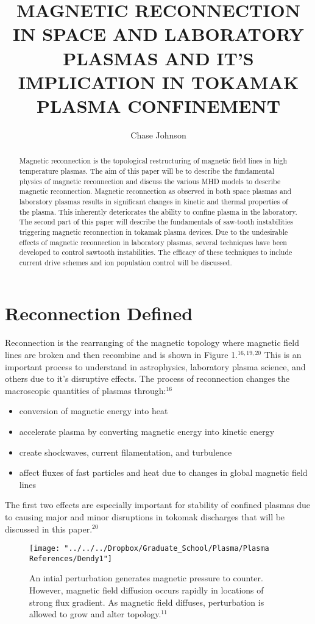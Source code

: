 \documentclass{article}
\begin{document}
\title{MAGNETIC RECONNECTION IN SPACE AND LABORATORY PLASMAS AND IT’S IMPLICATION IN TOKAMAK PLASMA CONFINEMENT}
\author{Chase Johnson}

\maketitle

\begin{abstract}
Magnetic reconnection is the topological restructuring of magnetic field lines in high temperature plasmas.    The aim of this paper will be to describe the fundamental physics of magnetic reconnection and discuss the various MHD models to describe magnetic reconnection.  Magnetic reconnection as observed in both space plasmas and laboratory plasmas results in significant changes in kinetic and thermal properties of the plasma.  This inherently deteriorates the ability to confine plasma in the laboratory.  The second part of this paper will describe the fundamentals of saw-tooth instabilities triggering magnetic reconnection in tokamak plasma devices.  Due to the undesirable effects of magnetic reconnection in laboratory plasmas, several techniques have been developed to control sawtooth instabilities.  The efficacy of these techniques to include current drive schemes and ion population control will be discussed.
\end{abstract}
\section{Reconnection Defined}
Reconnection is the rearranging of the magnetic topology where magnetic field lines are broken and then recombine and is shown in Figure 1.$^{16,19,20}$  This is an important process to understand in astrophysics, laboratory plasma science, and others due to it's disruptive effects.  The process of reconnection changes the macroscopic quantities of plasmas through:$^{16}$
\begin{itemize}
\item conversion of magnetic energy into heat
\item accelerate plasma by converting magnetic energy into kinetic energy
\item create shockwaves, current filamentation, and turbulence
\item affect fluxes of fast particles and heat due to changes in global magnetic field lines
\end{itemize}
The first two effects are especially important for stability of confined plasmas due to causing major and minor disruptions in tokomak discharges that will be discussed in this paper.$^{20}$
\begin{figure}[h]
\centering
\texttt{[image: "../../../Dropbox/Graduate\_School/Plasma/Plasma References/Dendy1"]}
\caption{An intial perturbation generates magnetic pressure to counter. However, magnetic field diffusion occurs rapidly in locations of strong flux gradient. As magnetic field diffuses, perturbation is allowed to grow and alter topology.$^{11}$}
\label{fig:Dendy1}
\end{figure}
\end{document}
